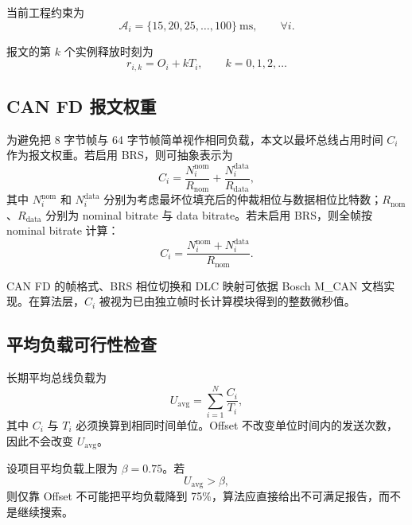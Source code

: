 \documentclass[UTF8,12pt,a4paper]{ctexart}
\newcommand{\Oset}{\mathcal{A}}
\begin{document}
当前工程约束为
\begin{equation}
\Oset_i=\{15,20,25,\ldots,100\}\ \mathrm{ms},\qquad \forall i.
\label{eq:offset-set}
\end{equation}

报文的第 $k$ 个实例释放时刻为
\begin{equation}
 r_{i,k}=O_i+kT_i,\qquad k=0,1,2,\ldots
\label{eq:release}
\end{equation}

\subsection{CAN FD 报文权重}

为避免把 8 字节帧与 64 字节帧简单视作相同负载，本文以最坏总线占用时间 $C_i$ 作为报文权重。若启用 BRS，则可抽象表示为
\begin{equation}
 C_i=\frac{N^{\mathrm{nom}}_i}{R_{\mathrm{nom}}}
     +\frac{N^{\mathrm{data}}_i}{R_{\mathrm{data}}},
\label{eq:frame-time-brs}
\end{equation}
其中 $N^{\mathrm{nom}}_i$ 和 $N^{\mathrm{data}}_i$ 分别为考虑最坏位填充后的仲裁相位与数据相位比特数；$R_{\mathrm{nom}}$、$R_{\mathrm{data}}$ 分别为 nominal bitrate 与 data bitrate。若未启用 BRS，则全帧按 nominal bitrate 计算：
\begin{equation}
 C_i=\frac{N^{\mathrm{nom}}_i+N^{\mathrm{data}}_i}{R_{\mathrm{nom}}}.
\label{eq:frame-time-no-brs}
\end{equation}

CAN FD 的帧格式、BRS 相位切换和 DLC 映射可依据 Bosch M\_CAN 文档实现\cite{boschmcan}。在算法层，$C_i$ 被视为已由独立帧时长计算模块得到的整数微秒值。

\subsection{平均负载可行性检查}

长期平均总线负载为
\begin{equation}
 U_{\mathrm{avg}}=\sum_{i=1}^{N}\frac{C_i}{T_i},
\label{eq:avg-load}
\end{equation}
其中 $C_i$ 与 $T_i$ 必须换算到相同时间单位。Offset 不改变单位时间内的发送次数，因此不会改变 $U_{\mathrm{avg}}$。

设项目平均负载上限为 $\beta=0.75$。若
\begin{equation}
 U_{\mathrm{avg}}>\beta,
\end{equation}
则仅靠 Offset 不可能把平均负载降到 75\%，算法应直接给出不可满足报告，而不是继续搜索。
\end{document}
